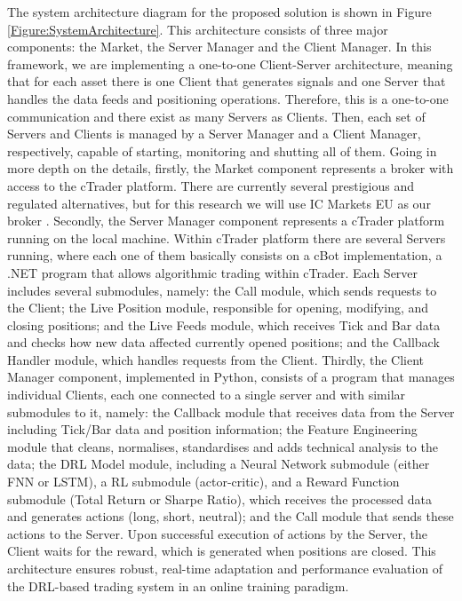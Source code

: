 The system architecture diagram for the proposed solution is shown in Figure \ref{Figure:SystemArchitecture}. This architecture consists of three major components: the Market, the Server Manager and the Client Manager. In this framework, we are implementing a one-to-one Client-Server architecture, meaning that for each asset there is one Client that generates signals and one Server that handles the data feeds and positioning operations. Therefore, this is a one-to-one communication and there exist as many Servers as Clients. Then, each set of Servers and Clients is managed by a Server Manager and a Client Manager, respectively, capable of starting, monitoring and shutting all of them. Going in more depth on the details, firstly, the Market component represents a broker with access to the cTrader platform. There are currently several prestigious and regulated alternatives, but for this research we will use IC Markets EU as our broker \cite{noauthor_cfd_nodate}. Secondly, the Server Manager component represents a cTrader platform running on the local machine. Within cTrader platform there are several Servers running, where each one of them basically consists on a cBot implementation, a .NET program that allows algorithmic trading within cTrader. Each Server includes several submodules, namely: the Call module, which sends requests to the Client; the Live Position module, responsible for opening, modifying, and closing positions; and the Live Feeds module, which receives Tick and Bar data and checks how new data affected currently opened positions; and the Callback Handler module, which handles requests from the Client. Thirdly, the Client Manager component, implemented in Python, consists of a program that manages individual Clients, each one connected to a single server and with similar submodules to it, namely: the Callback module that receives data from the Server including Tick/Bar data and position information; the Feature Engineering module that cleans, normalises, standardises and adds technical analysis to the data; the DRL Model module, including a Neural Network submodule (either FNN or LSTM), a RL submodule (actor-critic), and a Reward Function submodule (Total Return or Sharpe Ratio), which receives the processed data and generates actions (long, short, neutral); and the Call module that sends these actions to the Server. Upon successful execution of actions by the Server, the Client waits for the reward, which is generated when positions are closed. This architecture ensures robust, real-time adaptation and performance evaluation of the DRL-based trading system in an online training paradigm.

